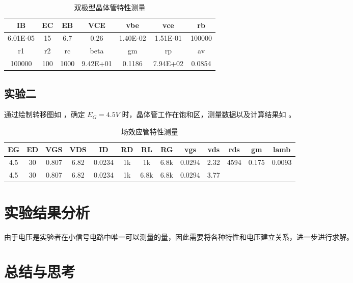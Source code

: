 \documentclass[lang=cn,11pt,a4paper,cite=authoryear]{elegantpaper}
\begin{document}
\begin{table}[htb]
\centering
\caption{双极型晶体管特性测量}
\label{t1}
\begin{tabular}{|c|c|c|c|c|c|c|}
\hline
IB       & EC  & EB   & VCE      & vbe      & vce      & rb     \\ \hline
6.01E-05 & 15  & 6.7  & 0.26     & 1.40E-02 & 1.51E-01 & 100000 \\ \hline
r1       & r2  & rc   & beta     & gm       & rp       & av     \\ \hline
100000   & 100 & 1000 & 9.42E+01 & 0.1186   & 7.94E+02 & 0.0854 \\ \hline
\end{tabular}
\end{table}

\subsection{实验二}

通过绘制转移图如  ，确定 \(E_G = 4.5 V\) 时，晶体管工作在饱和区，测量数据以及计算结果如  。



\begin{table}[htb]
\centering
\caption{场效应管特性测量}
\label{t2}
\begin{tabular}{|c|c|c|c|c|c|c|c|c|c|c|c|c|}
\hline
EG  & ED & VGS   & VDS  & ID     & RD & RL   & RG   & vgs    & vds  & rds  & gm    & lamb   \\ \hline
4.5 & 30 & 0.807 & 6.82 & 0.0234 & 1k & 1k   & 6.8k & 0.0294 & 2.32 & 4594 & 0.175 & 0.0093 \\ \hline
4.5 & 30 & 0.807 & 6.82 & 0.0234 & 1k & 6.8k & 6.8k & 0.0294 & 3.77 &      &       &        \\ \hline
\end{tabular}
\end{table}

\section{实验结果分析}

由于电压是实验者在小信号电路中唯一可以测量的量，因此需要将各种特性和电压建立关系，进一步进行求解。

\section{总结与思考}
\end{document}
